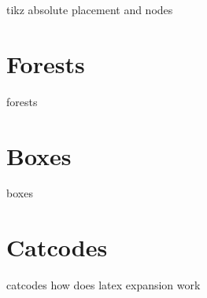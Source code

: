 \begin{frame}{\insertsection}
   tikz absolute placement and nodes
\end{frame}

\section{Forests}
\begin{frame}{\insertsection}
   forests
\end{frame}

\section{Boxes}
\begin{frame}{\insertsection}
   boxes
\end{frame}

\section{Catcodes}
\begin{frame}{\insertsection}
   catcodes
   how does latex expansion work
\end{frame}




